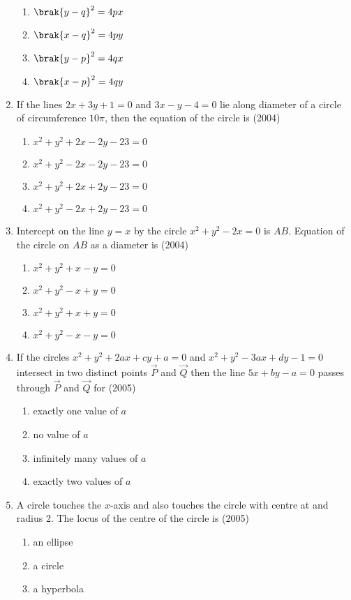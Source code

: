 \begin{enumerate}
\begin{multicols}{2}
\begin{enumerate}
\item $\brak{y-q}^2=4px$
\item $\brak{x-q}^2=4py$ 
\item $\brak{y-p}^2=4qx$
\item $\brak{x-p}^2=4qy$
\end{enumerate}
\end{multicols}
\item If the lines $2x+3y+1=0$ and $3x-y-4=0$ lie along diameter of a circle of circumference $10\pi$,  then the equation of the circle is 
\hfill{(2004)}
\begin{enumerate}
\item $x^2+y^2+2x-2y-23=0$
\item $x^2+y^2-2x-2y-23=0$
\item $x^2+y^2+2x+2y-23=0$
\item $x^2+y^2-2x+2y-23=0$
\end{enumerate}
\item Intercept on the line $y=x$ by the circle $x^2+y^2-2x=0$ is $AB$. Equation of the circle on $AB$ as a diameter is 
\hfill{(2004)}
\begin{enumerate}
\item $x^2+y^2+x-y=0$
\item $x^2+y^2-x+y=0$
\item $x^2+y^2+x+y=0$
\item $x^2+y^2-x-y=0$
\end{enumerate}
\item If the circles $x^2+y^2+2ax+cy+a=0$ and $x^2+y^2-3ax+dy-1=0$ intersect in two distinct points $\vec{P}$ and $\vec{Q}$ then the line $5x+by-a=0$ passes through $\vec{P}$ and $\vec{Q}$ for
\hfill{(2005)}
\begin{enumerate}
\item exactly one value of $a$
\item no value of $a$
\item infinitely many values of $a$
\item exactly two values of $a$
\end{enumerate}
\item A circle touches the $x$-axis and also touches the circle with centre at  and radius 2. The locus of the centre of the circle is
\hfill{(2005)}
\begin{multicols}{2}
\begin{enumerate}
\item an ellipse
\item a circle 
\item a hyperbola

\end{enumerate}
\end{multicols}
\end{enumerate}
